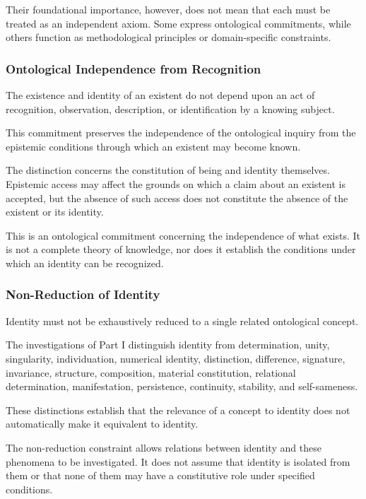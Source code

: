 Their foundational importance, however, does not mean
that each must be treated as an independent axiom.
Some express ontological commitments, while others
function as methodological principles or domain-specific
constraints.

\subsubsection{Ontological Independence from Recognition}

The existence and identity of an existent do not depend
upon an act of recognition, observation, description,
or identification by a knowing subject.

This commitment preserves the independence of the
ontological inquiry from the epistemic conditions
through which an existent may become known.

The distinction concerns the constitution of being
and identity themselves. Epistemic access may affect
the grounds on which a claim about an existent is
accepted, but the absence of such access does not
constitute the absence of the existent or its identity.

This is an ontological commitment concerning the
independence of what exists. It is not a complete
theory of knowledge, nor does it establish the
conditions under which an identity can be recognized.

\subsubsection{Non-Reduction of Identity}

Identity must not be exhaustively reduced to a single
related ontological concept.

The investigations of Part I distinguish identity
from determination, unity, singularity, individuation,
numerical identity, distinction, difference, signature,
invariance, structure, composition, material constitution,
relational determination, manifestation, persistence,
continuity, stability, and self-sameness.

These distinctions establish that the relevance of
a concept to identity does not automatically make
it equivalent to identity.

The non-reduction constraint allows relations between
identity and these phenomena to be investigated.
It does not assume that identity is isolated from
them or that none of them may have a constitutive
role under specified conditions.

